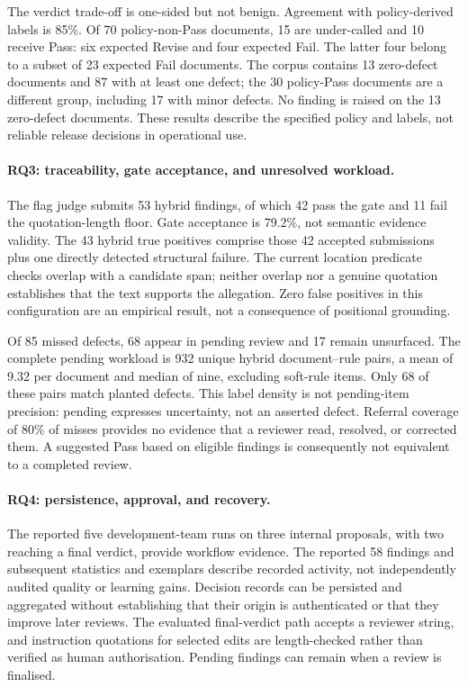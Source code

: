 \documentclass[computers,article,submit,moreauthors]{Definitions/mdpi}
\begin{document}
The verdict trade-off is one-sided but not benign. Agreement with policy-derived labels is 85\%. Of 70 policy-non-Pass documents, 15 are under-called and 10 receive Pass: six expected Revise and four expected Fail. The latter four belong to a subset of 23 expected Fail documents. The corpus contains 13 zero-defect documents and 87 with at least one defect; the 30 policy-Pass documents are a different group, including 17 with minor defects. No finding is raised on the 13 zero-defect documents. These results describe the specified policy and labels, not reliable release decisions in operational use.

\paragraph{RQ3: traceability, gate acceptance, and unresolved workload.}
The flag judge submits 53 hybrid findings, of which 42 pass the gate and 11 fail the quotation-length floor. Gate acceptance is 79.2\%, not semantic evidence validity. The 43 hybrid true positives comprise those 42 accepted submissions plus one directly detected structural failure. The current location predicate checks overlap with a candidate span; neither overlap nor a genuine quotation establishes that the text supports the allegation. Zero false positives in this configuration are an empirical result, not a consequence of positional grounding.

Of 85 missed defects, 68 appear in pending review and 17 remain unsurfaced. The complete pending workload is 932 unique hybrid document--rule pairs, a mean of 9.32 per document and median of nine, excluding soft-rule items. Only 68 of these pairs match planted defects. This label density is not pending-item precision: pending expresses uncertainty, not an asserted defect. Referral coverage of 80\% of misses provides no evidence that a reviewer read, resolved, or corrected them. A suggested Pass based on eligible findings is consequently not equivalent to a completed review.

\paragraph{RQ4: persistence, approval, and recovery.}
The reported five development-team runs on three internal proposals, with two reaching a final verdict, provide workflow evidence. The reported 58 findings and subsequent statistics and exemplars describe recorded activity, not independently audited quality or learning gains. Decision records can be persisted and aggregated without establishing that their origin is authenticated or that they improve later reviews. The evaluated final-verdict path accepts a reviewer string, and instruction quotations for selected edits are length-checked rather than verified as human authorisation. Pending findings can remain when a review is finalised.
\end{document}
